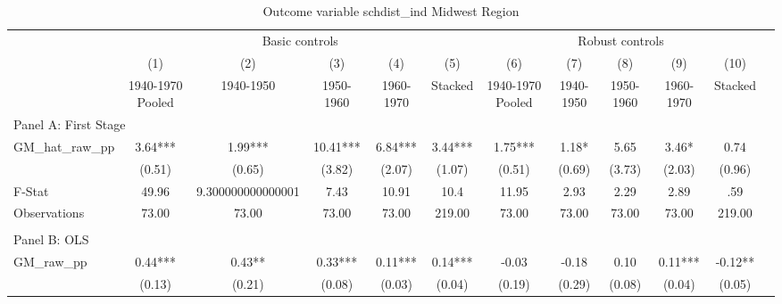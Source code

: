  \begin{table}[htbp]\centering {} \begin{threeparttable} \caption{Outcome variable schdist\_ind Midwest Region} \begin{tabular}{l*{11}{c}} \toprule
          &\multicolumn{5}{c}{Basic controls}                                   &\multicolumn{5}{c}{Robust controls}                                  \\\cmidrule(lr){2-6}\cmidrule(lr){7-11}
          &\multicolumn{1}{c}{(1)}&\multicolumn{1}{c}{(2)}&\multicolumn{1}{c}{(3)}&\multicolumn{1}{c}{(4)}&\multicolumn{1}{c}{(5)}&\multicolumn{1}{c}{(6)}&\multicolumn{1}{c}{(7)}&\multicolumn{1}{c}{(8)}&\multicolumn{1}{c}{(9)}&\multicolumn{1}{c}{(10)}\\
          &\multicolumn{1}{c}{1940-1970 Pooled}&\multicolumn{1}{c}{1940-1950}&\multicolumn{1}{c}{1950-1960}&\multicolumn{1}{c}{1960-1970}&\multicolumn{1}{c}{Stacked}&\multicolumn{1}{c}{1940-1970 Pooled}&\multicolumn{1}{c}{1940-1950}&\multicolumn{1}{c}{1950-1960}&\multicolumn{1}{c}{1960-1970}&\multicolumn{1}{c}{Stacked}\\
\cmidrule(lr){1-11}
\multicolumn{10}{l}{Panel A: First Stage}\\
\cmidrule(lr){1-11}
GM\_hat\_raw\_pp&      3.64***&      1.99***&     10.41***&      6.84***&      3.44***&      1.75***&      1.18*  &      5.65   &      3.46*  &      0.74   \\
          &    (0.51)   &    (0.65)   &    (3.82)   &    (2.07)   &    (1.07)   &    (0.51)   &    (0.69)   &    (3.73)   &    (2.03)   &    (0.96)   \\
\midrule
F-Stat    &     49.96   &9.300000000000001   &      7.43   &     10.91   &      10.4   &     11.95   &      2.93   &      2.29   &      2.89   &       .59   \\
Observations&     73.00   &     73.00   &     73.00   &     73.00   &    219.00   &     73.00   &     73.00   &     73.00   &     73.00   &    219.00   \\
\cmidrule[\heavyrulewidth](lr){1-11} \\ \cmidrule[\heavyrulewidth](lr){1-11}
\multicolumn{10}{l}{Panel B: OLS}\\
\cmidrule(lr){1-11}
GM\_raw\_pp &      0.44***&      0.43** &      0.33***&      0.11***&      0.14***&     -0.03   &     -0.18   &      0.10   &      0.11***&     -0.12** \\
          &    (0.13)   &    (0.21)   &    (0.08)   &    (0.03)   &    (0.04)   &    (0.19)   &    (0.29)   &    (0.08)   &    (0.04)   &    (0.05)   \\

\end{tabular}
\end{threeparttable}
\end{table}
